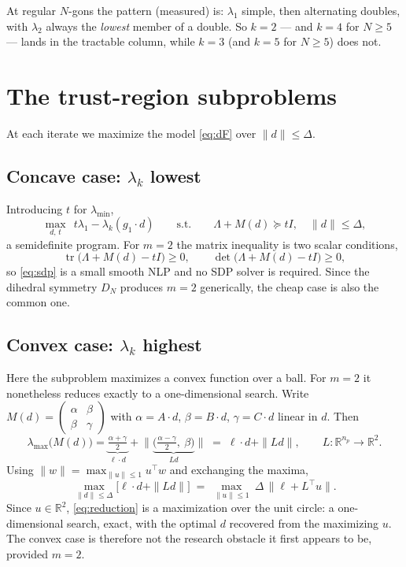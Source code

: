 \documentclass[11pt]{article}
\newcommand{\lammin}{\lambda_{\min}}
\newcommand{\lammax}{\lambda_{\max}}
\theoremstyle{definition}
\begin{document}
\noindent At regular $N$-gons the pattern (measured) is: $\lambda_1$ simple, then alternating
doubles, with $\lambda_2$ always the \emph{lowest} member of a double. So $k=2$ --- and $k=4$ for
$N\ge5$ --- lands in the tractable column, while $k=3$ (and $k=5$ for $N\ge5$) does not.

\section{The trust-region subproblems}

At each iterate we maximize the model \eqref{eq:dF} over $\|d\|\le\Delta$.

\subsection{Concave case: $\lambda_k$ lowest}

Introducing $t$ for $\lammin$,
\begin{equation}\label{eq:sdp}
  \max_{d,\,t}\ \ t\lambda_1-\lambda_k(g_1\!\cdot\!d)
  \qquad\text{s.t.}\qquad \Lambda+M(d)\succeq tI,\quad \|d\|\le\Delta ,
\end{equation}
a semidefinite program. For $m=2$ the matrix inequality is two scalar conditions,
\[
  \operatorname{tr}\big(\Lambda+M(d)-tI\big)\ge0,
  \qquad \det\big(\Lambda+M(d)-tI\big)\ge0,
\]
so \eqref{eq:sdp} is a small smooth NLP and no SDP solver is required. Since the dihedral
symmetry $D_N$ produces $m=2$ generically, the cheap case is also the common one.

\subsection{Convex case: $\lambda_k$ highest}\label{sec:convex}

Here the subproblem maximizes a convex function over a ball. For $m=2$ it nonetheless reduces
exactly to a one-dimensional search. Write $M(d)=\begin{pmatrix}\alpha&\beta\\
\beta&\gamma\end{pmatrix}$ with $\alpha=A\!\cdot\!d$, $\beta=B\!\cdot\!d$, $\gamma=C\!\cdot\!d$
linear in $d$. Then
\begin{equation}\label{eq:lammax}
  \lammax\big(M(d)\big)=\underbrace{\tfrac{\alpha+\gamma}{2}}_{\ell\cdot d}
  +\Big\|\underbrace{\big(\tfrac{\alpha-\gamma}{2},\ \beta\big)}_{L d}\Big\|
  \;=\;\ell\!\cdot\!d+\|Ld\|,\qquad L:\mathbb{R}^{n_p}\to\mathbb{R}^2 .
\end{equation}
Using $\|w\|=\max_{\|u\|\le1}u^{\!\top}w$ and exchanging the maxima,
\begin{equation}\label{eq:reduction}
  \max_{\|d\|\le\Delta}\Big[\ell\!\cdot\!d+\|Ld\|\Big]
  \;=\;\max_{\|u\|\le1}\ \Delta\,\big\|\ell+L^{\!\top}u\big\| .
\end{equation}
Since $u\in\mathbb{R}^2$, \eqref{eq:reduction} is a maximization over the unit circle: a
one-dimensional search, exact, with the optimal $d$ recovered from the maximizing $u$. The
convex case is therefore not the research obstacle it first appears to be, provided $m=2$.
\end{document}
